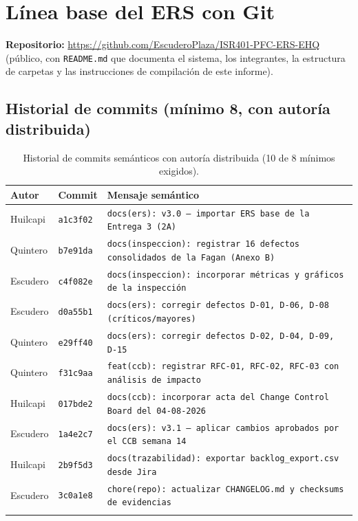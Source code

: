 \documentclass[11pt,a4paper]{article}
\begin{document}
\section{Línea base del ERS con Git}

\noindent\textbf{Repositorio:}
\url{https://github.com/EscuderoPlaza/ISR401-PFC-ERS-EHQ} (público, con \texttt{README.md} que
documenta el sistema, los integrantes, la estructura de carpetas y las instrucciones de
compilación de este informe).

\subsection{Historial de commits (mínimo 8, con autoría distribuida)}

\begin{longtable}{p{1.6cm}p{3.6cm}p{7.7cm}}
\toprule
\textbf{Autor} & \textbf{Commit} & \textbf{Mensaje semántico} \\
\midrule
\endhead
Huilcapi & \texttt{a1c3f02} & \texttt{docs(ers): v3.0 -- importar ERS base de la Entrega 3 (2A)} \\
Quintero & \texttt{b7e91da} & \texttt{docs(inspeccion): registrar 16 defectos consolidados de la Fagan (Anexo B)} \\
Escudero & \texttt{c4f082e} & \texttt{docs(inspeccion): incorporar métricas y gráficos de la inspección} \\
Escudero & \texttt{d0a55b1} & \texttt{docs(ers): corregir defectos D-01, D-06, D-08 (críticos/mayores)} \\
Quintero & \texttt{e29ff40} & \texttt{docs(ers): corregir defectos D-02, D-04, D-09, D-15} \\
Quintero & \texttt{f31c9aa} & \texttt{feat(ccb): registrar RFC-01, RFC-02, RFC-03 con análisis de impacto} \\
Huilcapi & \texttt{017bde2} & \texttt{docs(ccb): incorporar acta del Change Control Board del 04-08-2026} \\
Escudero & \texttt{1a4e2c7} & \texttt{docs(ers): v3.1 -- aplicar cambios aprobados por el CCB semana 14} \\
Huilcapi & \texttt{2b9f5d3} & \texttt{docs(trazabilidad): exportar backlog\_export.csv desde Jira} \\
Escudero & \texttt{3c0a1e8} & \texttt{chore(repo): actualizar CHANGELOG.md y checksums de evidencias} \\
\bottomrule
\caption{Historial de commits semánticos con autoría distribuida (10 de 8 mínimos exigidos).}
\end{longtable}
\end{document}
